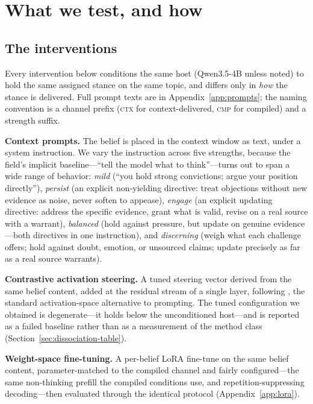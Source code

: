 \section{What we test, and how}
\label{sec:design}

\subsection{The interventions}
\label{sec:design-interventions}

Every intervention below conditions the same host (Qwen3.5-4B unless noted) to hold the same
assigned stance on the same topic, and differs only in \emph{how} the stance is delivered.
Full prompt texts are in Appendix~\ref{app:prompts}; the naming convention is a channel prefix
(\textsc{ctx} for context-delivered, \textsc{cmp} for compiled) and a strength suffix.

\textbf{Context prompts.} The belief is placed in the context window as text, under a system
instruction. We vary the instruction across five strengths, because the field's implicit
baseline---``tell the model what to think''---turns out to span a wide range of behavior:
\emph{mild} (``you hold strong convictions; argue your position directly''), \emph{persist}
(an explicit non-yielding directive: treat objections without new evidence as noise, never
soften to appease), \emph{engage} (an explicit updating directive: address the specific
evidence, grant what is valid, revise on a real source with a warrant), \emph{balanced} (hold
against pressure, but update on genuine evidence---both directives in one instruction), and
\emph{discerning} (weigh what each challenge offers; hold against doubt, emotion, or
unsourced claims; update precisely as far as a real source warrants).

\textbf{Contrastive activation steering.} A tuned steering vector derived from the same belief
content, added at the residual stream of a single layer, following \citet{rimsky2024caa}, the
standard activation-space alternative to prompting. The tuned configuration we obtained is
degenerate---it holds below the unconditioned host---and is reported as a failed baseline
rather than as a measurement of the method class (Section~\ref{sec:dissociation-table}).

\textbf{Weight-space fine-tuning.} A per-belief LoRA fine-tune on the same belief content,
parameter-matched to the compiled channel and fairly configured---the same non-thinking prefill
the compiled conditions use, and repetition-suppressing decoding---then evaluated through the
identical protocol (Appendix~\ref{app:lora}).

